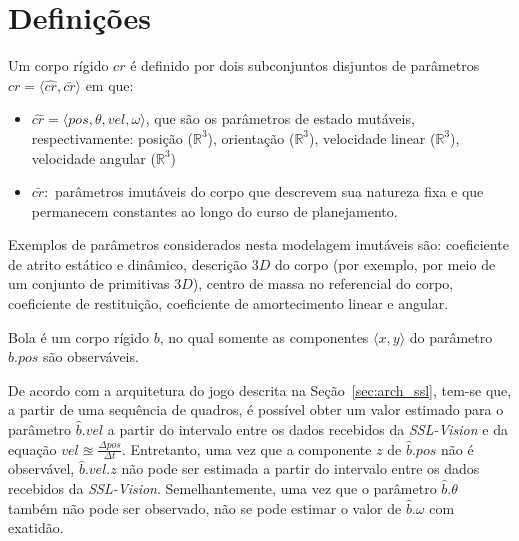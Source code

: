 \section{Definições}\label{sec:defs}

\begin{defi}
  Um corpo rígido $cr$ é definido por dois subconjuntos disjuntos
  de parâmetros $cr= \langle \hat{cr}, \bar{cr} \rangle$ em que:
  \begin{itemize}
    \item $\hat{cr} = \langle pos, \theta, vel, \omega \rangle$,
    que são os parâmetros de estado mutáveis, respectivamente:
    posição ($\mathbb{R} ^{3}$), orientação ($\mathbb{R} ^{3}$),
    velocidade linear ($\mathbb{R} ^{3}$), velocidade angular
    ($\mathbb{R} ^{3}$)

    \item $\bar{cr} :$ parâmetros imutáveis do corpo que descrevem sua
    natureza fixa e que permanecem constantes ao longo do curso de 
    planejamento.
  \end{itemize}
\end{defi}

  Exemplos de parâmetros considerados nesta modelagem imutáveis são:
  coeficiente de atrito estático e dinâmico, descrição $3D$ do corpo
  (por exemplo, por meio de um conjunto de primitivas $3D$), centro de
  massa no referencial do corpo, coeficiente de restituição,
  coeficiente de amortecimento linear e angular.

\begin{defi}[Bola]\label{def:bola}
  Bola é um corpo rígido $b$, no qual somente as componentes
  $\langle x,y \rangle$ do parâmetro $\hat{b}.pos$ são
  observáveis.
\end{defi}

  De acordo com a arquitetura do jogo descrita na Seção~\ref{sec:arch_ssl},
  tem-se que, a partir de uma sequência
  de quadros, é possível obter um valor estimado para o parâmetro
  $\hat{b}.vel$ a partir do intervalo entre os dados recebidos
  da \textit{SSL-Vision} e da equação $ vel \approxeq 
  \frac{\Delta pos}{\Delta t} $. Entretanto, uma vez que a componente
  $z$ de $\hat{b}.pos$ não é observável, $\hat{b}.vel.z$ 
  não pode ser estimada a partir do intervalo entre os dados recebidos
  da \textit{SSL-Vision}. Semelhantemente,  uma vez que o
  parâmetro $\hat{b}.\theta$ também não pode ser observado,
  não se pode estimar o valor de $\hat{b}.\omega$ com exatidão.


